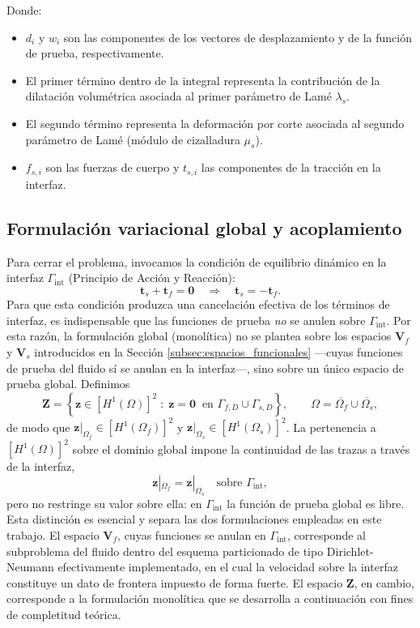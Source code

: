 \documentclass[12pt, letterpaper]{report}
\theoremstyle{definition}
\begin{document}
Donde:
\begin{itemize}
    \item $d_i$ y $w_i$ son las componentes de los vectores de desplazamiento y de la función de prueba, respectivamente.
    \item El primer término dentro de la integral representa la contribución de la dilatación volumétrica asociada al primer parámetro de Lamé $\lambda_s$.
    \item El segundo término representa la deformación por corte asociada al segundo parámetro de Lamé (módulo de cizalladura $\mu_s$).
    \item $f_{s,i}$ son las fuerzas de cuerpo y $t_{s,i}$ las componentes de la tracción en la interfaz.
\end{itemize}

\subsection{Formulación variacional global y acoplamiento}
\label{subsec:formulacion_global}

Para cerrar el problema, invocamos la condición de equilibrio dinámico en la interfaz $\Gamma_{\text{int}}$ (Principio de Acción y Reacción):
\[
\mathbf{t}_s + \mathbf{t}_f = \mathbf{0} \quad \Rightarrow \quad \mathbf{t}_s = -\mathbf{t}_f.
\]
Para que esta condición produzca una cancelación efectiva de los términos de interfaz, es indispensable que las funciones de prueba \emph{no} se anulen sobre $\Gamma_{\text{int}}$. Por esta razón, la formulación global (monolítica) no se plantea sobre los espacios $\mathbf{V}_f$ y $\mathbf{V}_s$ introducidos en la Sección \ref{subsec:espacios_funcionales} ---cuyas funciones de prueba del fluido sí se anulan en la interfaz---, sino sobre un único espacio de prueba global. Definimos
\begin{equation} \label{eq:espacio_global}
    \mathbf{Z} = \left\{ \mathbf{z} \in [H^1(\Omega)]^2 \; : \; \mathbf{z} = \mathbf{0} \ \text{ en } \Gamma_{f,D} \cup \Gamma_{s,D} \right\}, \qquad \Omega = \overline{\Omega_f} \cup \overline{\Omega_s},
\end{equation}
de modo que $\mathbf{z}|_{\Omega_f} \in [H^1(\Omega_f)]^2$ y $\mathbf{z}|_{\Omega_s} \in [H^1(\Omega_s)]^2$. La pertenencia a $[H^1(\Omega)]^2$ sobre el dominio global impone la continuidad de las trazas a través de la interfaz,
\[
    \mathbf{z}|_{\Omega_f} = \mathbf{z}|_{\Omega_s} \quad \text{sobre } \Gamma_{\text{int}},
\]
pero no restringe su valor sobre ella: en $\Gamma_{\text{int}}$ la función de prueba global es libre. Esta distinción es esencial y separa las dos formulaciones empleadas en este trabajo. El espacio $\mathbf{V}_f$, cuyas funciones se anulan en $\Gamma_{\text{int}}$, corresponde al subproblema del fluido dentro del esquema particionado de tipo Dirichlet-Neumann efectivamente implementado, en el cual la velocidad sobre la interfaz constituye un dato de frontera impuesto de forma fuerte. El espacio $\mathbf{Z}$, en cambio, corresponde a la formulación monolítica que se desarrolla a continuación con fines de completitud teórica.
\end{document}
